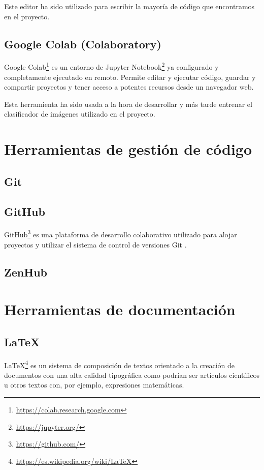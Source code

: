 Este editor ha sido utilizado para escribir la mayoría de código que encontramos en el proyecto.


\subsection{Google Colab (Colaboratory)}
Google Colab\footnote{\url{https://colab.research.google.com}} es un entorno de Jupyter Notebook\footnote{\url{https://jupyter.org/}} ya configurado y completamente ejecutado en remoto. Permite editar y ejecutar código, guardar y compartir proyectos y tener acceso a potentes recursos desde un navegador web.

Esta herramienta ha sido usada a la hora de desarrollar y más tarde entrenar el clasificador de imágenes utilizado en el proyecto.


\section{Herramientas de gestión de código}


\subsection{Git}


\subsection{GitHub}
GitHub\footnote{\url{https://github.com/}} es una plataforma de desarrollo colaborativo utilizado para alojar proyectos y utilizar el sistema de control de versiones Git \cite{wiki:github}.


\subsection{ZenHub}


\section{Herramientas de documentación}


\subsection{LaTeX}
\LaTeX{}\footnote{\url{https://es.wikipedia.org/wiki/LaTeX}} es un sistema de composición de textos orientado a la creación de documentos con una alta calidad tipográfica como podrían ser artículos científicos u otros textos con, por ejemplo, expresiones matemáticas.

